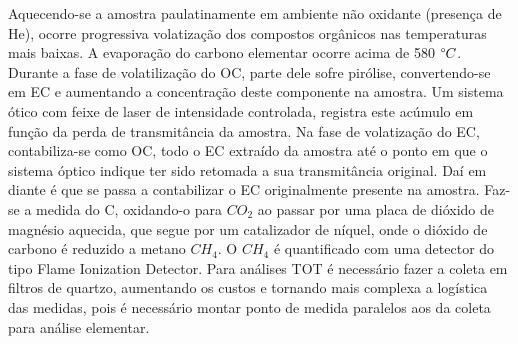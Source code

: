 Aquecendo-se a amostra paulatinamente em ambiente não oxidante (presença de He),
ocorre progressiva volatização dos compostos orgânicos nas temperaturas mais 
baixas. A evaporação do carbono elementar ocorre acima de 580 $\degree C$.
Durante a fase de volatilização do OC, parte dele sofre pirólise, 
convertendo-se em EC e aumentando a concentração deste componente na amostra. 
Um sistema ótico com feixe de laser de intensidade controlada, registra este 
acúmulo em função da perda de transmitância da amostra.
Na fase de volatização do EC, contabiliza-se como OC, todo o EC extraído da 
amostra até o ponto em que o sistema óptico indique ter sido retomada a sua 
transmitância original. Daí em diante é que se passa a contabilizar o EC 
originalmente presente na amostra.
Faz-se a medida do C, oxidando-o para $CO_2$ ao passar por uma placa de dióxido
de magnésio aquecida, que segue por um catalizador de níquel, 
onde o dióxido de carbono é reduzido a metano $CH_4$. O $CH_4$ é quantificado 
com uma detector do tipo Flame Ionization Detector.
Para análises TOT é necessário fazer a coleta em filtros de quartzo, aumentando 
os custos e tornando mais complexa a logística das medidas, 
pois é necessário montar ponto de medida paralelos aos da coleta para análise
elementar.
